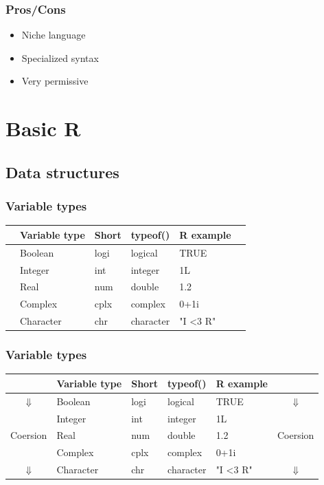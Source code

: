\documentclass{beamer}
\begin{document}
\begin{frame}
	\frametitle{Pros/Cons}
	\begin{itemize}
		\item Niche language
		\item Specialized syntax
		\item Very permissive
	\end{itemize}
\end{frame}

\section{Basic R}

\subsection{Data structures}

\begin{frame}
\frametitle{Variable types}
\begin{table}
\begin{tabular}{l l l l l l}
\toprule
&\textbf{Variable type}&\textbf{Short}&\textbf{typeof()}&\textbf{R example}&\\
\midrule
&Boolean & logi & logical & TRUE &\\
&Integer & int & integer & 1L &\\
&Real & num & double & 1.2 &\\
&Complex & cplx & complex & 0+1i &\\
&Character & chr & character & "I \textless3 R" &\\
\bottomrule
\end{tabular}
\end{table}
\end{frame}


\begin{frame}
	\frametitle{Variable types}
	\begin{table}
		\begin{tabular}{c l l l l c}
			\toprule
			&\textbf{Variable type}&\textbf{Short}&\textbf{typeof()}&\textbf{R 
			example}&\\
			\midrule
			$\Downarrow$ & Boolean & logi & logical & TRUE & $\Downarrow$\\
			 & Integer & int & integer & 1L &\\
			Coersion& Real & num & double & 1.2 & Coersion\\
			&Complex & cplx & complex & 0+1i &\\
			$\Downarrow$&Character & chr & character & "I \textless3 R" & 
			$\Downarrow$\\
			\bottomrule
		\end{tabular}
	\end{table}
\end{frame}
\end{document}
